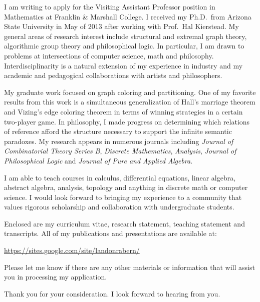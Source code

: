 \documentclass[10pt,stdletter,dateno]{newlfm}
\begin{document}
\begin{newlfm}

I am writing to apply for the Visiting Assistant Professor position in Mathematics at Franklin \& Marshall College. I received my Ph.D.\ from Arizona State University in May of 2013 after working with Prof.\ Hal Kierstead. 
My general areas of research interest include structural and extremal graph theory, algorithmic group theory and philosophical logic.  
In particular, I am drawn to problems at intersections of computer science, math and philosophy.  
Interdisciplinarity is a natural extension of my experience in industry and my academic and pedagogical collaborations with artists and philosophers.  

My graduate work focused on graph coloring and partitioning.  
One of my favorite results from this work is a simultaneous generalization of Hall's marriage theorem and Vizing's edge coloring theorem in terms of winning strategies in a certain two-player game.  
In philosophy, I made progress on determining which relations of reference afford the structure necessary to support the infinite semantic paradoxes.  
My research appears in numerous journals including \textit{Journal of Combinatorial Theory Series B}, \emph{Discrete Mathematics}, \textit{Analysis}, \textit{Journal of Philosophical Logic} and \textit{Journal of Pure and Applied Algebra}.

I am able to teach courses in calculus, differential equations, linear algebra, abstract algebra, analysis, topology and anything in discrete math or computer science.  
I would look forward to bringing my experience to a community that values rigorous scholarship and collaboration with undergraduate students.

Enclosed are my curriculum vitae, research statement, teaching statement and transcripts.  
All of my publications and presentations are available at:

\url{https://sites.google.com/site/landonrabern/}

Please let me know if there are any other materials or information that will assist you in processing my application.

Thank you for your consideration.  I look forward to hearing from you.

\end{newlfm}
\end{document}

